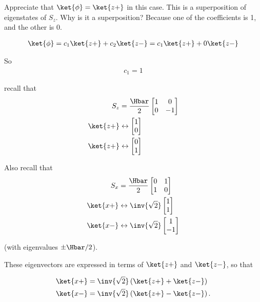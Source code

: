 Appreciate that $\ket{\phi} = \ket{z+}$ in this case.  This is a superposition of eigenstates of $S_z$.  Why is it a superposition?  Because one of the coefficients is 1, and the other is 0.

\begin{align}\label{eqn:PHY356Foct26:106}
\ket{\phi}
=
 c_1 \ket{z+}
+ c_2 \ket{z-}
=
 c_1 \ket{z+}
+ 0 \ket{z-}
\end{align}

So
\begin{align}\label{eqn:PHY356Foct26:107}
c_1 = 1
\end{align}

recall that
\begin{align}\label{eqn:PHY356Foct26:108}
S_z &= \frac{\Hbar}{2}
\begin{bmatrix}
1 & 0 \\
0 & -1
\end{bmatrix} \\
\ket{z+} &\leftrightarrow
\begin{bmatrix}
1 \\
0
\end{bmatrix} \\
\ket{z+} &\leftrightarrow
\begin{bmatrix}
0 \\
1
\end{bmatrix}
\end{align}

Also recall that
\begin{align}\label{eqn:PHY356Foct26:109}
S_x &= \frac{\Hbar}{2}
\begin{bmatrix}
0 & 1 \\
1 & 0
\end{bmatrix} \\
\ket{x+} &\leftrightarrow
\inv{\sqrt{2}}
\begin{bmatrix}
1 \\
1
\end{bmatrix} \\
\ket{x-} &\leftrightarrow
\inv{\sqrt{2}}
\begin{bmatrix}
1 \\
-1
\end{bmatrix}
\end{align}

(with eigenvalues $\pm\Hbar/2$).

These eigenvectors are expressed in terms of $\ket{z+}$ and $\ket{z-}$, so that

\begin{align}\label{eqn:PHY356Foct26:110}
\ket{x+}
&=
\inv{\sqrt{2}} \left( \ket{z+} + \ket{z-} \right) \\
\ket{x-}
&=
\inv{\sqrt{2}} \left( \ket{z+} - \ket{z-} \right) .
\end{align}

